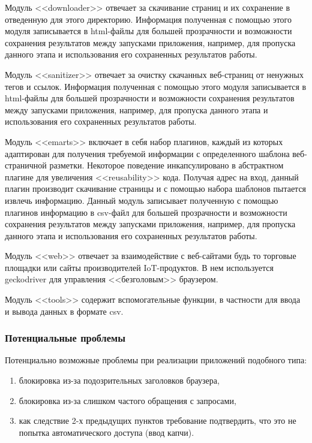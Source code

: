 \documentclass[../main]{subfiles}
\begin{document}
Модуль <<downloader>> отвечает за скачивание страниц и их сохранение в отведенную для этого директорию. Информация полученная с помощью этого модуля записывается в html-файлы для большей прозрачности и возможности сохранения результатов между запусками приложения, например, для пропуска данного этапа и использования его сохраненных результатов работы.

Модуль <<sanitizer>> отвечает за очистку скачанных веб-страниц от не\-нужных тегов и ссылок. Информация полученная с помощью этого модуля записывается в html-файлы для большей прозрачности и возможности сохранения результатов между запусками приложения, например, для пропуска данного этапа и использования его сохраненных результатов работы.

Модуль <<emarts>> включает в себя набор плагинов, каждый из которых адаптирован для получения требуемой информации с определенного шаблона веб-страничной разметки. Некоторое поведение инкапсулировано в абстрактном плагине для увеличения <<reusability>> кода. Получая адрес на вход, данный плагин производит скачивание страницы и с помощью набора шаблонов пытается извлечь информацию. Данный модуль записывает полученную с помощью плагинов информацию в csv-файл для большей прозрачности и возможности сохранения результатов между запусками приложения, например, для пропуска данного этапа и использования его сохраненных результатов работы.

Модуль <<web>> отвечает за взаимодействие с веб-сайтами будь то торговые площадки или сайты производителей IoT-продуктов. В нем используется geckodriver для управления <<безголовым>> браузером.

Модуль <<tools>> содержит вспомогательные функции, в частности для ввода и вывода данных в формате csv.

\subsubsection{Потенциальные проблемы}
Потенциально возможные проблемы при реализации приложений подобного типа:
\begin{enumerate}
    \item блокировка из-за подозрительных заголовков браузера,
    \item блокировка из-за слишком частого обращения с запросами,
    \item как следствие 2-х предыдущих пунктов требование подтвердить, что это не попытка автоматического доступа (ввод капчи).
\end{enumerate}
\end{document}
